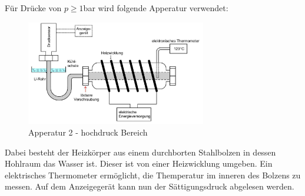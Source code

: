 Für Drücke von $p\geq 1$bar wird folgende Apperatur verwendet:
\begin{figure}
    \centering
    \includegraphics[width=0.7\textwidth]{bilder/analge2.jpg}
    \caption{Apperatur 2 - hochdruck Bereich \cite[183]{Anleitung}}
    \label{fig:app2}
\end{figure}

Dabei besteht der Heizkörper aus einem durchborten Stahlbolzen in dessen
Hohlraum das Wasser ist. Dieser ist von einer Heizwicklung umgeben.
Ein elektrisches Thermometer ermöglicht, die Themperatur im inneren des
Bolzens zu messen.
Auf dem Anzeigegerät kann nun der Sättigungsdruck abgelesen werden. 






